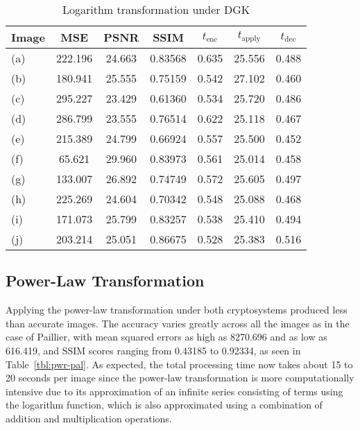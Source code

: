 \begin{table}[t]
	\caption{Logarithm transformation under DGK}
	\label{tbl:log-dgk}
    \begin{tabular}{lcccccc}
        \hline
        Image & MSE  & PSNR & SSIM & $t_\text{enc}$ & $t_\text{apply}$ & $t_\text{dec}$ \\ \hline
		(a) & 222.196 & 24.663 & 0.83568 & 0.635 & 25.556 & 0.488 \\
		(b) & 180.941 & 25.555 & 0.75159 & 0.542 & 27.102 & 0.460 \\
		(c) & 295.227 & 23.429 & 0.61360 & 0.534 & 25.720 & 0.486 \\
		(d) & 286.799 & 23.555 & 0.76514 & 0.622 & 25.118 & 0.467 \\
		(e) & 215.389 & 24.799 & 0.66924 & 0.557 & 25.500 & 0.452 \\
		(f) & 65.621 & 29.960 & 0.83973 & 0.561 & 25.014 & 0.458 \\
		(g) & 133.007 & 26.892 & 0.74749 & 0.572 & 25.605 & 0.497 \\
		(h) & 225.269 & 24.604 & 0.70342 & 0.548 & 25.088 & 0.468 \\
		(i) & 171.073 & 25.799 & 0.83257 & 0.538 & 25.410 & 0.494 \\
		(j) & 203.214 & 25.051 & 0.86675 & 0.528 & 25.383 & 0.516 \\
		\hline
    \end{tabular}
\end{table}

\subsection{Power-Law Transformation}
Applying the power-law transformation under both cryptosystems produced less than accurate images. The accuracy varies greatly across all the images as in the case of Paillier, with mean squared errors as high as 8270.696 and as low as 616.419, and SSIM scores ranging from 0.43185 to 0.92334, as seen in Table~\ref{tbl:pwr-pal}. As expected, the total processing time now takes about 15 to 20 seconds per image since the power-law transformation is more computationally intensive due to its approximation of an infinite series consisting of terms using the logarithm function, which is also approximated using a combination of addition and multiplication operations.

